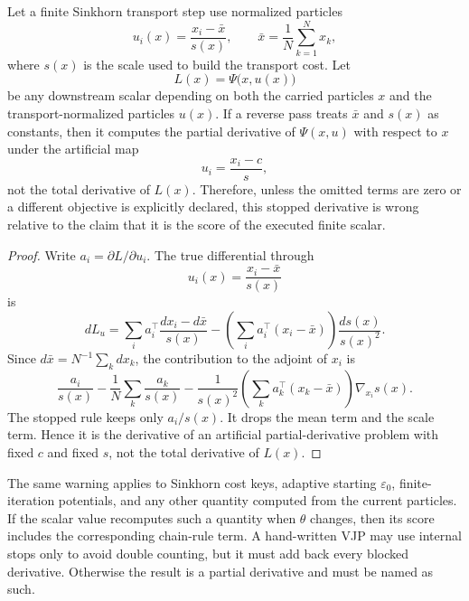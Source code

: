 \begin{proposition}
\label{prop:bf-eot-stopped-normalization-partial}
Let a finite Sinkhorn transport step use normalized particles
\[
  u_i(x)=\frac{x_i-\bar x}{s(x)},\qquad
  \bar x=\frac{1}{N}\sum_{k=1}^N x_k,
\]
where \(s(x)\) is the scale used to build the transport cost.  Let
\[
  L(x)=\Psi\bigl(x,u(x)\bigr)
\]
be any downstream scalar depending on both the carried particles \(x\) and the
transport-normalized particles \(u(x)\).  If a reverse pass treats \(\bar x\)
and \(s(x)\) as constants, then it computes the partial derivative of
\(\Psi(x,u)\) with respect to \(x\) under the artificial map
\[
  u_i=\frac{x_i-c}{s},
\]
not the total derivative of \(L(x)\).  Therefore, unless the omitted terms are
zero or a different objective is explicitly declared, this stopped derivative is
wrong relative to the claim that it is the score of the executed finite scalar.
\end{proposition}

\begin{proof}
Write \(a_i=\partial L/\partial u_i\).  The true differential through
\[
  u_i(x)=\frac{x_i-\bar x}{s(x)}
\]
is
\[
  dL_u
  =
  \sum_i a_i^\top \frac{dx_i-d\bar x}{s(x)}
  -
  \left(\sum_i a_i^\top (x_i-\bar x)\right)\frac{ds(x)}{s(x)^2}.
\]
Since \(d\bar x=N^{-1}\sum_k dx_k\), the contribution to the adjoint of
\(x_i\) is
\[
  \frac{a_i}{s(x)}
  -
  \frac{1}{N}\sum_k \frac{a_k}{s(x)}
  -
  \frac{1}{s(x)^2}
  \left(\sum_k a_k^\top (x_k-\bar x)\right)\nabla_{x_i}s(x).
\]
The stopped rule keeps only \(a_i/s(x)\).  It drops the mean term and the scale
term.  Hence it is the derivative of an artificial partial-derivative problem
with fixed \(c\) and fixed \(s\), not the total derivative of \(L(x)\).
\end{proof}

The same warning applies to Sinkhorn cost keys, adaptive starting
\(\varepsilon_0\), finite-iteration potentials, and any other quantity computed
from the current particles.  If the scalar value recomputes such a quantity
when \(\theta\) changes, then its score includes the corresponding chain-rule
term.  A hand-written VJP may use internal stops only to avoid double counting,
but it must add back every blocked derivative.  Otherwise the result is a
partial derivative and must be named as such.

